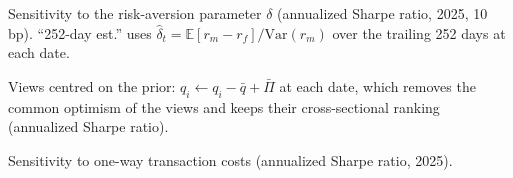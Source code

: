 \begin{table}[h]
\centering
\caption{Sensitivity to the risk-aversion parameter $\delta$ (annualized Sharpe ratio, 2025, 10 bp). ``252-day est.'' uses $\hat\delta_t = \mathbb{E}[r_m-r_f]/\mathrm{Var}(r_m)$ over the trailing 252 days at each date.}
\label{tab:delta}
\small

\end{table}

\begin{table}[h]
\centering
\caption{Views centred on the prior: $q_i \leftarrow q_i - \bar q + \bar\Pi$ at each date, which removes the common optimism of the views and keeps their cross-sectional ranking (annualized Sharpe ratio).}
\label{tab:center}
\small

\end{table}

\begin{table}[h]
\centering
\caption{Sensitivity to one-way transaction costs (annualized Sharpe ratio, 2025).}
\label{tab:costs}
\small

\end{table}
